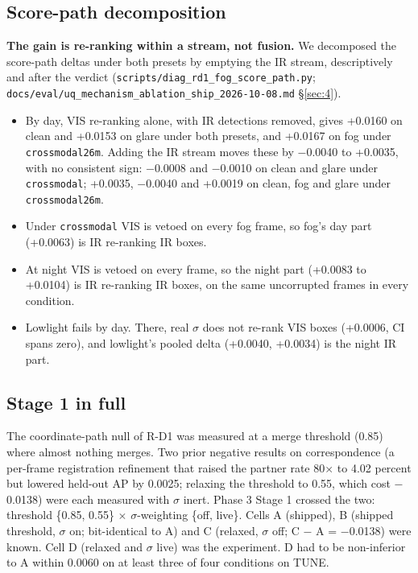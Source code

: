\documentclass[10pt]{article}
\begin{document}
\subsection{Score-path decomposition}\label{app:H.2}
\textbf{The gain is re-ranking within a stream, not fusion.} We decomposed the score-path deltas under both presets by emptying the IR stream, descriptively and after the verdict (\texttt{scripts/\allowbreak{}diag\_\allowbreak{}rd1\_\allowbreak{}fog\_\allowbreak{}score\_\allowbreak{}path.py}; \texttt{docs/\allowbreak{}eval/\allowbreak{}uq\_\allowbreak{}mechanism\_\allowbreak{}ablation\_\allowbreak{}ship\_\allowbreak{}2026-10-08.md} \S\ref{sec:4}).
\begin{itemize}
\item By day, VIS re-ranking alone, with IR detections removed, gives +0.0160 on clean and +0.0153 on glare under both presets, and +0.0167 on fog under \texttt{crossmodal26m}. Adding the IR stream moves these by $-$0.0040 to +0.0035, with no consistent sign: $-$0.0008 and $-$0.0010 on clean and glare under \texttt{crossmodal}; +0.0035, $-$0.0040 and +0.0019 on clean, fog and glare under \texttt{crossmodal26m}.
\item Under \texttt{crossmodal} VIS is vetoed on every fog frame, so fog's day part (+0.0063) is IR re-ranking IR boxes.
\item At night VIS is vetoed on every frame, so the night part (+0.0083 to +0.0104) is IR re-ranking IR boxes, on the same uncorrupted frames in every condition.
\item Lowlight fails by day. There, real $\sigma$ does not re-rank VIS boxes (+0.0006, CI spans zero), and lowlight's pooled delta (+0.0040, +0.0034) is the night IR part.
\end{itemize}

\subsection{Stage 1 in full}\label{app:H.3}
The coordinate-path null of R-D1 was measured at a merge threshold (0.85) where almost nothing merges. Two prior negative results on correspondence (a per-frame registration refinement that raised the partner rate 80$\times$ to 4.02 percent but lowered held-out AP by 0.0025; relaxing the threshold to 0.55, which cost $-$0.0138) were each measured with $\sigma$ inert. Phase 3 Stage 1 crossed the two: threshold \{0.85, 0.55\} $\times$ $\sigma$-weighting \{off, live\}. Cells A (shipped), B (shipped threshold, $\sigma$ on; bit-identical to A) and C (relaxed, $\sigma$ off; C $-$ A = $-$0.0138) were known. Cell D (relaxed and $\sigma$ live) was the experiment. D had to be non-inferior to A within 0.0060 on at least three of four conditions on TUNE.
\end{document}
